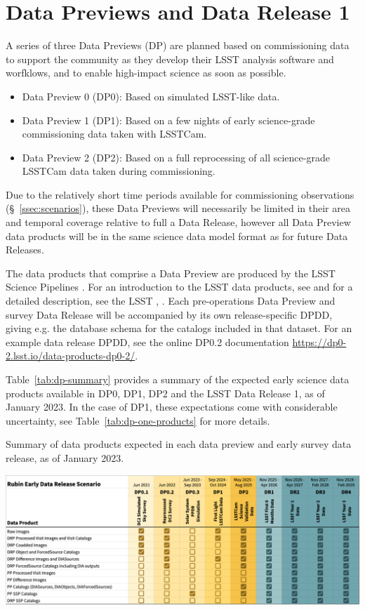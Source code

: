 \section{Data Previews and Data Release 1} 
\label{sec:datapreview}

A series of three Data Previews (DP) are planned  based on commissioning data to support the community as they develop their LSST analysis software and worfklows, and to enable high-impact science as soon as possible.
\begin{itemize}
\item Data Preview 0 (DP0): Based on simulated LSST-like data.
\item Data Preview 1 (DP1): Based on a few nights of early science-grade commissioning data taken with LSSTCam.
\item Data Preview 2 (DP2): Based on a full reprocessing of all science-grade LSSTCam data taken during commissioning.
\end{itemize}

Due to the relatively short time periods available for commissioning observations (\S~\ref{ssec:scenarios}), these Data Previews will necessarily be limited in their area and temporal coverage relative to full a Data Release, however all Data Preview data products will be in the same science data model format as for future Data Releases.

The data products that comprise a Data Preview are produced by the LSST Science Pipelines \citep{2019ASPC..523..521B,2018PASJ...70S...5B}.
For an introduction to the LSST data products, see \citet{RubinDataProductsAbridged} and for a detailed description, see the LSST \dpdd{},  .
Each pre-operations Data Preview and survey Data Release will be accompanied by its own release-specific DPDD, giving e.g. the  database schema for the catalogs included in that dataset.
For an example data release DPDD, see the online DP0.2 documentation {\url{https://dp0-2.lsst.io/data-products-dp0-2/}}.

Table~\ref{tab:dp-summary}  provides a summary of the expected early science data products available in DP0, DP1, DP2 and the LSST Data Release 1, as of January 2023.
In the case of DP1, these expectations come with considerable uncertainty, see Table~\ref{tab:dp-one-products} for more details.
\begin{table}[ht]
\centering
\label{tab:dp-summary}
\caption{Summary of data products expected in each data preview and early survey data release, as of January 2023.}
\includegraphics[width=\linewidth]{figures/DPR-summary}
\end{table}

